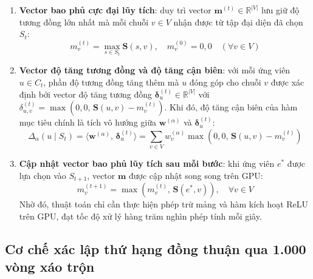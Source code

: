 \begin{enumerate}
    \item \textbf{Vector bao phủ cực đại lũy tích}: duy trì vector $\mathbf{m}^{(t)} \in \mathbb{R}^{|V|}$ lưu giữ độ tương đồng lớn nhất mà mỗi chuỗi $v \in V$ nhận được từ tập đại diện đã chọn $S_t$:
    \begin{equation}
    m_v^{(t)} = \max_{s \in S_t} \mathbf{S}(s, v), \quad m_v^{(0)} = 0{,}0 \quad (\forall v \in V)
    \end{equation}
    
    \item \textbf{Vector độ tăng tương đồng và độ tăng cận biên}: với mỗi ứng viên $u \in C_t$, phần độ tương đồng tăng thêm mà $u$ đóng góp cho chuỗi $v$ được xác định bởi vector độ tăng tương đồng $\boldsymbol{\delta}_u^{(t)} \in \mathbb{R}^{|V|}$ với $\delta_{u, v}^{(t)} = \max\left(0{,}0, \, \mathbf{S}(u, v) - m_v^{(t)}\right)$. Khi đó, độ tăng cận biên của hàm mục tiêu chính là tích vô hướng giữa $\mathbf{w}^{(\alpha)}$ và $\boldsymbol{\delta}_u^{(t)}$:
    \begin{equation}
    \Delta_\alpha(u \mid S_t) = \langle \mathbf{w}^{(\alpha)}, \, \boldsymbol{\delta}_u^{(t)} \rangle = \sum_{v \in V} w_v^{(\alpha)} \max\left(0{,}0, \, \mathbf{S}(u, v) - m_v^{(t)}\right)
    \end{equation}
    
    \item \textbf{Cập nhật vector bao phủ lũy tích sau mỗi bước}: khi ứng viên $e^*$ được lựa chọn vào $S_{t+1}$, vector $\mathbf{m}$ được cập nhật song song trên GPU:
    \begin{equation}
    m_v^{(t+1)} = \max\left(m_v^{(t)}, \, \mathbf{S}(e^*, v)\right), \quad \forall v \in V
    \end{equation}
    Nhờ đó, thuật toán chỉ cần thực hiện phép trừ mảng và hàm kích hoạt ReLU trên GPU, đạt tốc độ xử lý hàng trăm nghìn phép tính mỗi giây.
\end{enumerate}

\subsection{Cơ chế xác lập thứ hạng đồng thuận qua 1.000 vòng xáo trộn}
\label{subsec:consensus_ranking}

